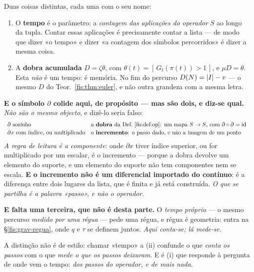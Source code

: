 \documentclass[livro.tex]{subfiles}
\begin{document}
\begin{definicao}\label{fis:def:tempo}
Duas coisas distintas, cada uma com o seu nome:
\begin{enumerate}\itemsep3pt
\item[(i)] O \textbf{tempo} é o parâmetro: a \emph{contagem das aplicações do
operador} $S$ ao longo da tupla. Contar essas aplicações é precisamente contar a
lista --- de modo que dizer «o tempo» e dizer «a contagem dos símbolos
percorridos» é dizer a mesma coisa.
\item[(ii)] A \textbf{dobra acumulada} $D=\zeta\theta$, com
$\theta(t)=[\,G_{t}(\pi(t))>1\,]$, e $\mu D=\theta$. Esta \emph{não} é um tempo:
é memória. No fim do percurso $D(N)=\lvert I\rvert-v$ --- o mesmo $D$ do
Teor.~\ref{fis:thm:euler}, e não outra grandeza com a mesma letra.
\end{enumerate}
\medskip\noindent\textbf{E o símbolo $\partial$ colide aqui, de propósito ---
mas são dois, e diz-se qual.} \emph{Não são o mesmo objecto}, e dizê-lo seria
falso:
\[
\begin{array}{ll}
\partial\ \text{sozinho} & \text{a \textbf{dobra} da Def.~\ref{fis:def:op}: um mapa }S\to S\text{, com }\partial\circ\partial=\mathrm{id}\\[2pt]
\partial x\ \text{com índice, ou multiplicado} & \text{o \textbf{incremento}: o passo dado, e não a imagem de um ponto}
\end{array}
\]
\emph{A regra de leitura é a componente}: onde $\partial x$ tiver índice
superior, ou for multiplicado por um escalar, é o incremento --- porque a dobra
devolve um elemento do suporte, e um elemento do suporte não tem componentes nem
se escala. \textbf{E o incremento não é um diferencial importado do contínuo}: é
a diferença entre dois lugares da lista, que é finita e já está construída.
\emph{O que se partilha é a palavra «passo», e não o operador.}

\medskip\noindent\textbf{E falta uma terceira, que não é desta parte.} O
\emph{tempo próprio} --- o mesmo percurso \emph{medido por uma régua} --- pede
uma régua, e régua é geometria: entra na §\ref{fis:grav-regua}, onde $q$ e $\tau$
se definem juntos. \emph{Aqui conta-se; lá mede-se.}
\end{definicao}

\medskip\noindent A distinção não é de estilo: chamar «tempo» a (ii) confunde o
que \emph{conta os passos} com o que \emph{mede o que os passos deixaram}. E é
(i) que responde à pergunta de onde vem o tempo: \emph{dos passos do operador, e
de mais nada}.
\end{document}
